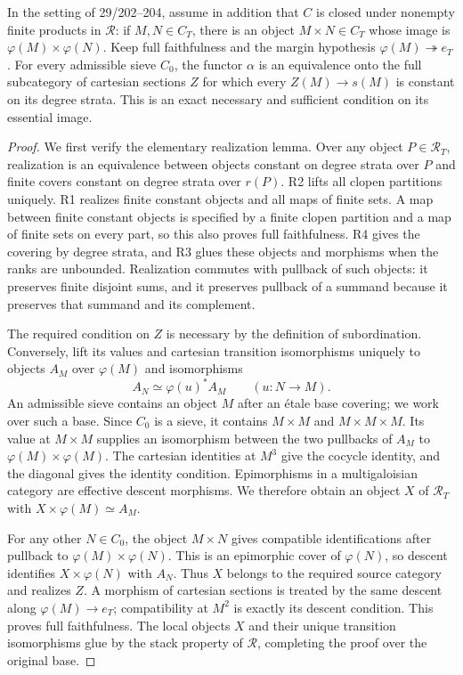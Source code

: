 \begin{proposition}
\label{D:alpha-products-image}
In the setting of 29/202--204, assume in addition that $C$ is closed
under nonempty finite products in $\mathscr R$: if $M,N\in C_T$,
there is an object $M\times N\in C_T$ whose image is
$\varphi(M)\times\varphi(N)$. Keep full faithfulness and the margin
hypothesis $\varphi(M)\twoheadrightarrow e_T$.
For every admissible sieve $C_0$, the functor $\alpha$ is an equivalence
onto the full subcategory of cartesian sections $Z$ for which every
$Z(M)\to s(M)$ is constant on its degree strata. This is an exact
necessary and sufficient condition on its essential image.
\end{proposition}
\begin{proof}
We first verify the elementary realization lemma. Over any object
$P\in\mathscr R_T$, realization is an equivalence between objects
constant on degree strata over $P$ and finite covers constant on
degree strata over $r(P)$. R2 lifts all clopen partitions uniquely.
R1 realizes finite constant objects and all maps of finite sets.
A map between finite constant objects is specified by a finite
clopen partition and a map of finite sets on every part, so this
also proves full faithfulness. R4 gives the covering by degree
strata, and R3 glues these objects and morphisms when the ranks are
unbounded. Realization commutes with pullback of such objects:
it preserves finite disjoint sums, and it preserves pullback of a
summand because it preserves that summand and its complement.

The required condition on $Z$ is necessary by the definition of
subordination. Conversely, lift its values and cartesian transition
isomorphisms uniquely to objects $A_M$ over $\varphi(M)$ and
isomorphisms
\[
 A_N\simeq \varphi(u)^*A_M\qquad(u:N\to M).
\]
An admissible sieve contains an object $M$ after an \'etale base
covering; we work over such a base. Since $C_0$ is a sieve, it
contains $M\times M$ and $M\times M\times M$. Its value at
$M\times M$ supplies an isomorphism between the two pullbacks
of $A_M$ to $\varphi(M)\times\varphi(M)$. The cartesian identities
at $M^3$ give the cocycle identity, and the diagonal gives the identity
condition. Epimorphisms in a multigaloisian category are effective
descent morphisms. We therefore obtain an object $X$ of $\mathscr R_T$
with $X\times\varphi(M)\simeq A_M$.

For any other $N\in C_0$, the object $M\times N$ gives compatible
identifications after pullback to $\varphi(M)\times\varphi(N)$.
This is an epimorphic cover of $\varphi(N)$, so descent identifies
$X\times\varphi(N)$ with $A_N$. Thus $X$ belongs to the required
source category and realizes $Z$. A morphism of cartesian sections
is treated by the same descent along $\varphi(M)\to e_T$;
compatibility at $M^2$ is exactly its descent condition. This proves
full faithfulness. The local objects $X$ and their unique transition
isomorphisms glue by the stack property of $\mathscr R$, completing
the proof over the original base.
\end{proof}

